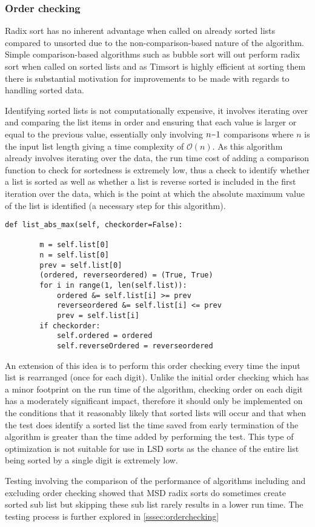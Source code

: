\documentclass[12pt]{article}
\newcommand{\minus}{\scalebox{0.75}[1.0]{$-$}}
\begin{document}
	\subsubsection{Order checking}
	\label{sssec:order}
Radix sort has no inherent advantage when called on already sorted lists compared to unsorted due to the non-comparison-based nature of the algorithm. Simple comparison-based algorithms such as bubble sort will out perform radix sort when called on sorted lists and as Timsort is highly efficient at sorting them there is substantial motivation for improvements to be made with regards to handling sorted data.
\par
Identifying sorted lists is not computationally expensive, it involves iterating over and comparing the list items in order and ensuring that each value is larger or equal to the previous value, essentially only involving $n\minus1$ comparisons where $n$ is the input list length giving a time complexity of $\mathcal{O}(n)$. As this algorithm already involves iterating over the data, the run time cost of adding a comparison function to check for sortedness is extremely low, thus a check to identify whether a list is sorted as well as whether a list is reverse sorted is included in the first iteration over the data, which is the point at which the absolute maximum value of the list is identified (a necessary step for this algorithm).
\begin{table}[H]
	\centering
	\begin{lstlisting}[caption={Checking whether the list is ordered or reverse ordered whilst\\ iterating over the list to identify the absolute maximum value},captionpos=b]
		def list_abs_max(self, checkorder=False):
	
		m = self.list[0]
		n = self.list[0]
		prev = self.list[0]
		(ordered, reverseordered) = (True, True)
		for i in range(1, len(self.list)):
			ordered &= self.list[i] >= prev
			reverseordered &= self.list[i] <= prev
			prev = self.list[i]
		if checkorder:
			self.ordered = ordered
			self.reverseOrdered = reverseordered
	\end{lstlisting}
\end{table}
\par
An extension of this idea is to perform this order checking every time the input list is rearranged (once for each digit). Unlike the initial order checking which has a minor footprint on the run time of the algorithm, checking order on each digit has a moderately significant impact, therefore it should only be implemented on the conditions that it reasonably likely that sorted lists will occur and that when the test does identify a sorted list the time saved from early termination of the algorithm is greater than the time added by performing the test. This type of optimization is not suitable for use in LSD sorts as the chance of the entire list being sorted by a single digit is extremely low.
\par
Testing involving the comparison of the performance of algorithms including and excluding order checking showed that MSD radix sorts do sometimes create sorted sub list but skipping these sub list rarely results in a lower run time. The testing process is further explored in \ref{sssec:orderchecking}
\pagebreak
\end{document}
